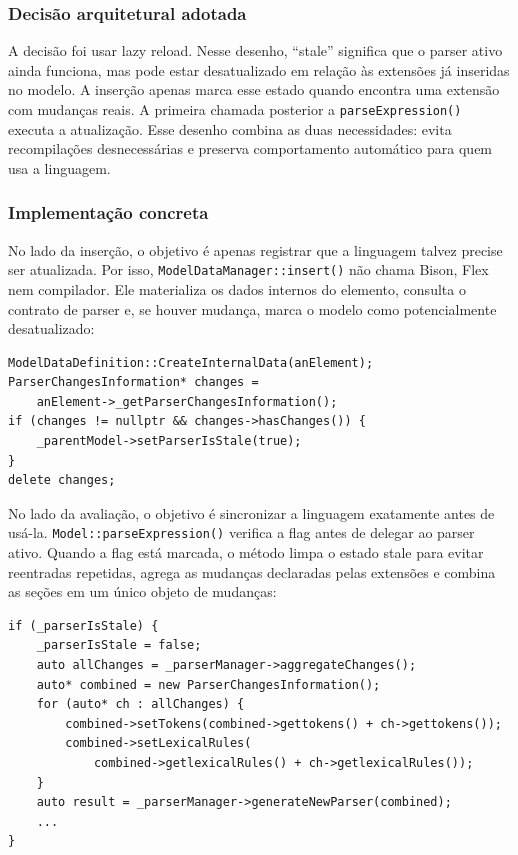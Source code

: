 \documentclass[12pt,a4paper]{article}
\begin{document}
\subsubsection{Decis\~ao arquitetural adotada}

A decis\~ao foi usar lazy reload. Nesse desenho, ``stale'' significa que o parser ativo ainda funciona, mas pode estar desatualizado em rela\c{c}\~ao \`as extens\~oes j\'a inseridas no modelo. A inser\c{c}\~ao apenas marca esse estado quando encontra uma extens\~ao com mudan\c{c}as reais. A primeira chamada posterior a \texttt{parseExpression()} executa a atualiza\c{c}\~ao. Esse desenho combina as duas necessidades: evita recompila\c{c}\~oes desnecess\'arias e preserva comportamento autom\'atico para quem usa a linguagem.

\subsubsection{Implementa\c{c}\~ao concreta}

No lado da inser\c{c}\~ao, o objetivo \'e apenas registrar que a linguagem talvez precise ser atualizada. Por isso, \texttt{ModelDataManager::insert()} n\~ao chama Bison, Flex nem compilador. Ele materializa os dados internos do elemento, consulta o contrato de parser e, se houver mudan\c{c}a, marca o modelo como potencialmente desatualizado:

\begin{lstlisting}[style=cppsmall]
ModelDataDefinition::CreateInternalData(anElement);
ParserChangesInformation* changes =
    anElement->_getParserChangesInformation();
if (changes != nullptr && changes->hasChanges()) {
    _parentModel->setParserIsStale(true);
}
delete changes;
\end{lstlisting}

No lado da avalia\c{c}\~ao, o objetivo \'e sincronizar a linguagem exatamente antes de us\'a-la. \texttt{Model::parseExpression()} verifica a flag antes de delegar ao parser ativo. Quando a flag est\'a marcada, o m\'etodo limpa o estado stale para evitar reentradas repetidas, agrega as mudan\c{c}as declaradas pelas extens\~oes e combina as se\c{c}\~oes em um \'unico objeto de mudan\c{c}as:

\begin{lstlisting}[style=cppsmall]
if (_parserIsStale) {
    _parserIsStale = false;
    auto allChanges = _parserManager->aggregateChanges();
    auto* combined = new ParserChangesInformation();
    for (auto* ch : allChanges) {
        combined->setTokens(combined->gettokens() + ch->gettokens());
        combined->setLexicalRules(
            combined->getlexicalRules() + ch->getlexicalRules());
    }
    auto result = _parserManager->generateNewParser(combined);
    ...
}
\end{lstlisting}
\end{document}
